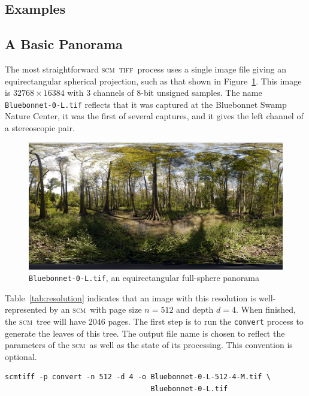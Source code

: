 \documentclass[oneside,10pt]{memoir}
\newcommand{\scm}     {\textsc{scm}}
\newcommand{\tiff}    {\textsc{tiff}}
\begin{document}
\begin{Spacing}{1.1}
\section{Examples}

\subsection{A Basic Panorama}
\label{sec:panorama}

The most straightforward \scm\ \tiff\ process uses a single image file giving an equirectangular spherical projection, such as that shown in Figure~\ref{fig:bluebonnet}. This image is $\num{32768}\times\num{16384}$ with 3 channels of 8-bit unsigned samples. The name \texttt{Bluebonnet-0-L.tif} reflects that it was captured at the Bluebonnet Swamp Nature Center, it was the first of several captures, and it gives the left channel of a stereoscopic pair.

\begin{figure}
  \centering
  \includegraphics[width=\textwidth]{fig/bluebonnet.png}
  \caption{\texttt{Bluebonnet-0-L.tif}, an equirectangular full-sphere panorama}
  \label{fig:bluebonnet}
\end{figure}

Table~\ref{tab:resolution} indicates that an image with this resolution is well-represented by an \scm\ with page size $n=512$ and depth $d=4$. When finished, the \scm\ tree will have $2046$ pages. The first step is to run the \texttt{convert} process to generate the leaves of this tree. The output file name is chosen to reflect the parameters of the \scm\ as well as the state of its processing. This convention is optional.

\begin{Verbatim}
scmtiff -p convert -n 512 -d 4 -o Bluebonnet-0-L-512-4-M.tif \
                                  Bluebonnet-0-L.tif
\end{Verbatim}


\end{Spacing}
\end{document}
